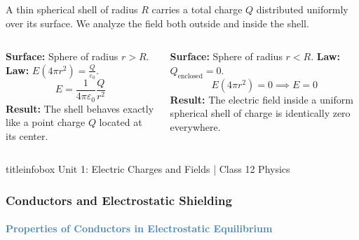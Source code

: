 \begin{frame}
\begin{frame}
\begin{keybox}
\vspace{0.1cm}
A thin spherical shell of radius $R$ carries a total charge $Q$ distributed uniformly over its surface. We analyze the field both outside and inside the shell.
\vspace{0.1cm}
\end{keybox}

\vspace{0.3cm}

\begin{columns}[T]
    \begin{examplebox}
    \vspace{0.1cm}
    \textbf{Surface:} Sphere of radius $r > R$.
    \textbf{Law:} $E(4\pi r^2) = \frac{Q}{\varepsilon_0}$.
    \begin{equation*}
    E = \frac{1}{4\pi\varepsilon_0} \frac{Q}{r^2}
    \end{equation*}
    \textbf{Result:} The shell behaves exactly like a point charge $Q$ located at its center.
    \end{examplebox}
    
    \begin{examplebox}
    \vspace{0.1cm}
    \textbf{Surface:} Sphere of radius $r < R$.
    \textbf{Law:} $Q_{\text{enclosed}} = 0$.
    \begin{equation*}
    E(4\pi r^2) = 0 \implies E=0
    \end{equation*}
    \textbf{Result:} The electric field inside a uniform spherical shell of charge is identically zero everywhere.
    \end{examplebox}
\end{columns}

\vfill

\begin{beamercolorbox}[wd=\textwidth,ht=0.5cm,dp=0.1cm,center]{titleinfobox}
    \small\color{coolgray} Unit 1: Electric Charges and Fields | Class 12 Physics
\end{beamercolorbox}
\end{frame}

\begin{frame}
\frametitle{\textsf{\textbf{Conductors and Electrostatic Shielding}}}
\framesubtitle{\textcolor{steelblue}{Properties of Conductors in Electrostatic Equilibrium}}


\end{frame}
\end{frame}
